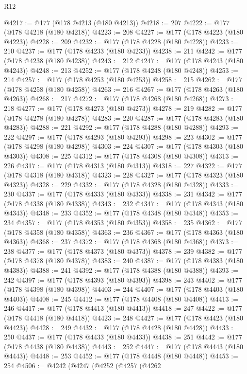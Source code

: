 \begin{lexlean}{R12}
\begin{coremodule}
@4217 := @177 (@178 @4213 (@180 @4213))
@4218 := 207
@4222 := @177 (@178 @4218 (@180 @4218))
@4223 := 208
@4227 := @177 (@178 @4223 (@180 @4223))
@4228 := 209
@4232 := @177 (@178 @4228 (@180 @4228))
@4233 := 210
@4237 := @177 (@178 @4233 (@180 @4233))
@4238 := 211
@4242 := @177 (@178 @4238 (@180 @4238))
@4243 := 212
@4247 := @177 (@178 @4243 (@180 @4243))
@4248 := 213
@4252 := @177 (@178 @4248 (@180 @4248))
@4253 := 214
@4257 := @177 (@178 @4253 (@180 @4253))
@4258 := 215
@4262 := @177 (@178 @4258 (@180 @4258))
@4263 := 216
@4267 := @177 (@178 @4263 (@180 @4263))
@4268 := 217
@4272 := @177 (@178 @4268 (@180 @4268))
@4273 := 218
@4277 := @177 (@178 @4273 (@180 @4273))
@4278 := 219
@4282 := @177 (@178 @4278 (@180 @4278))
@4283 := 220
@4287 := @177 (@178 @4283 (@180 @4283))
@4288 := 221
@4292 := @177 (@178 @4288 (@180 @4288))
@4293 := 222
@4297 := @177 (@178 @4293 (@180 @4293))
@4298 := 223
@4302 := @177 (@178 @4298 (@180 @4298))
@4303 := 224
@4307 := @177 (@178 @4303 (@180 @4303))
@4308 := 225
@4312 := @177 (@178 @4308 (@180 @4308))
@4313 := 226
@4317 := @177 (@178 @4313 (@180 @4313))
@4318 := 227
@4322 := @177 (@178 @4318 (@180 @4318))
@4323 := 228
@4327 := @177 (@178 @4323 (@180 @4323))
@4328 := 229
@4332 := @177 (@178 @4328 (@180 @4328))
@4333 := 230
@4337 := @177 (@178 @4333 (@180 @4333))
@4338 := 231
@4342 := @177 (@178 @4338 (@180 @4338))
@4343 := 232
@4347 := @177 (@178 @4343 (@180 @4343))
@4348 := 233
@4352 := @177 (@178 @4348 (@180 @4348))
@4353 := 234
@4357 := @177 (@178 @4353 (@180 @4353))
@4358 := 235
@4362 := @177 (@178 @4358 (@180 @4358))
@4363 := 236
@4367 := @177 (@178 @4363 (@180 @4363))
@4368 := 237
@4372 := @177 (@178 @4368 (@180 @4368))
@4373 := 238
@4377 := @177 (@178 @4373 (@180 @4373))
@4378 := 239
@4382 := @177 (@178 @4378 (@180 @4378))
@4383 := 240
@4387 := @177 (@178 @4383 (@180 @4383))
@4388 := 241
@4392 := @177 (@178 @4388 (@180 @4388))
@4393 := 242
@4397 := @177 (@178 @4393 (@180 @4393))
@4398 := 243
@4402 := @177 (@178 @4398 (@180 @4398))
@4403 := 244
@4407 := @177 (@178 @4403 (@180 @4403))
@4408 := 245
@4412 := @177 (@178 @4408 (@180 @4408))
@4413 := 246
@4417 := @177 (@178 @4413 (@180 @4413))
@4418 := 247
@4422 := @177 (@178 @4418 (@180 @4418))
@4423 := 248
@4427 := @177 (@178 @4423 (@180 @4423))
@4428 := 249
@4432 := @177 (@178 @4428 (@180 @4428))
@4433 := 250
@4437 := @177 (@178 @4433 (@180 @4433))
@4438 := 251
@4442 := @177 (@178 @4438 (@180 @4438))
@4443 := 252
@4447 := @177 (@178 @4443 (@180 @4443))
@4448 := 253
@4452 := @177 (@178 @4448 (@180 @4448))
@4453 := 254
@4506 := @4242
    (@4247
      (@4252
        (@4257
          (@4262

\end{coremodule}
\end{lexlean}
